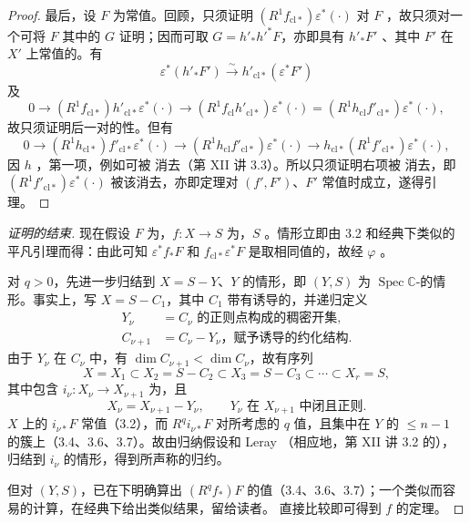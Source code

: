 \begin{proof}
最后，设 $F$ 为常值。回顾，只须证明 $(R^1f_{\mathrm{cl}*})\varepsilon^*(\cdot)$ 对 $F$ ，故只须对一个可将 $F$ 其中的 $G$ 证明；因而可取 $G=h'_*h'^*F$，亦即具有 $h'_*F'$ 、其中 $F'$ 在 $X'$ 上常值的。有
\[
\varepsilon^*(h'_*F')\xrightarrow{\sim}h'_{\mathrm{cl}*}(\varepsilon^*F')
\]
及
\[
0\longrightarrow(R^1f_{\mathrm{cl}*})h'_{\mathrm{cl}*}\varepsilon^*(\cdot)\longrightarrow(R^1f_{\mathrm{cl}}h'_{\mathrm{cl}*})\varepsilon^*(\cdot)=(R^1h_{\mathrm{cl}}f'_{\mathrm{cl}*})\varepsilon^*(\cdot),
\]
故只须证明后一对的性。但有
\[
0\longrightarrow(R^1h_{\mathrm{cl}*})f'_{\mathrm{cl}*}\varepsilon^*(\cdot)\longrightarrow(R^1h_{\mathrm{cl}}f'_{\mathrm{cl}*})\varepsilon^*(\cdot)\longrightarrow h_{\mathrm{cl}*}(R^1f'_{\mathrm{cl}*})\varepsilon^*(\cdot),
\]
因 $h$ ，第一项，例如可被 消去（第 XII 讲 3.3）。所以只须证明右项被 消去，即 $(R^1f'_{\mathrm{cl}*})\varepsilon^*(\cdot)$ 被该消去，亦即定理对 $(f',F')$、$F'$ 常值时成立，遂得引理。
\end{proof}
\begin{proof}[证明的结束]
现在假设 $F$ 为，$f:X\to S$ 为，$S$ 。情形立即由 3.2 和经典下类似的平凡引理而得：由此可知 $\varepsilon^*f_*F$ 和 $f_{\mathrm{cl}*}\varepsilon^*F$ 是取相同值的，故经 $\varphi$ 。

对 $q>0$，先进一步归结到 $X=S-Y$、$Y$ 的情形，即 $(Y,S)$ 为 $\operatorname{Spec}\mathbb C$-的情形。事实上，写 $X=S-C_1$，其中 $C_1$ 带有诱导的，并递归定义
\[
\begin{aligned}
Y_\nu&=C_\nu\text{ 的正则点构成的稠密开集},\\
C_{\nu+1}&=C_\nu-Y_\nu\text{，赋予诱导的约化结构}.
\end{aligned}
\]
由于 $Y_\nu$ 在 $C_\nu$ 中，有 $\dim C_{\nu+1}<\dim C_\nu$，故有序列
\[
X=X_1\subset X_2=S-C_2\subset X_3=S-C_3\subset\cdots\subset X_r=S,
\]
其中包含 $i_\nu:X_\nu\to X_{\nu+1}$ 为，且
\[
X_\nu=X_{\nu+1}-Y_\nu,\qquad Y_\nu\text{ 在 }X_{\nu+1}\text{ 中闭且正则}.
\]
$X$ 上的 $i_{\nu*}F$ 常值（3.2），而 $R^qi_{\nu*}F$ 对所考虑的 $q$ 值，且集中在 $Y$ 的 $\leq n-1$ 的簇上（3.4、3.6、3.7）。故由归纳假设和 Leray （相应地，第 XII 讲 3.2 的），归结到 $i_\nu$ 的情形，得到所声称的归约。

但对 $(Y,S)$，已在下明确算出 $(R^qf_*)F$ 的值（3.4、3.6、3.7）；一个类似而容易的计算，在经典下给出类似结果，留给读者。
直接比较即可得到 $f$ 的定理。
\end{proof}
